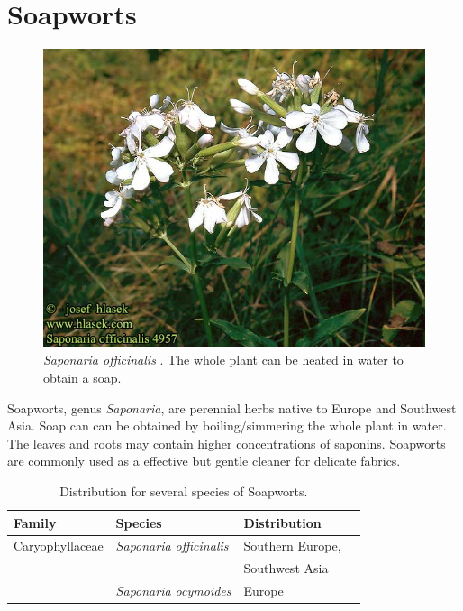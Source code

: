 \documentclass[a4paper]{article}
\begin{document}
\section{Soapworts}
\begin{figure}[H]
\centering
\includegraphics{images/saponaria_officinalis_plant}
\caption{{\it Saponaria officinalis} \citep{Hlasek}. 
         The whole plant can be heated in water to obtain a soap.} 
\end{figure}

Soapworts, genus {\it Saponaria}, are perennial herbs native to 
Europe and Southwest Asia. Soap can can be obtained by 
boiling/simmering the whole plant in water. 
The leaves and roots may contain higher concentrations of saponins.
Soapworts are commonly used as a effective but 
gentle cleaner for delicate fabrics.

\begin{table}[H]
\centering
\begin{tabular}{llll} \toprule
Family & Species & Distribution \\ \midrule
Caryophyllaceae & {\it Saponaria officinalis} & Southern Europe, \\
                &                             & Southwest Asia \\
                & {\it Saponaria ocymoides}   & Europe \\
\bottomrule
\end{tabular}
\caption{Distribution for several species of Soapworts.}
\end{table}


\clearpage


\end{document}
